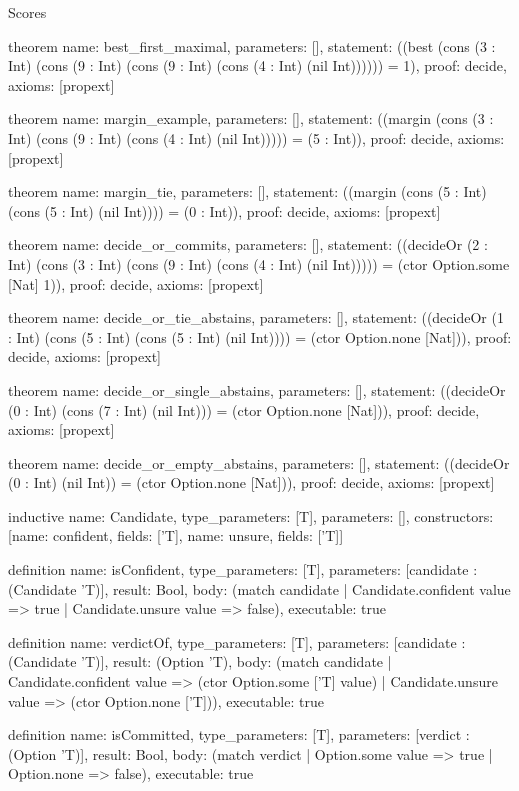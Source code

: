 \begin{lexlean}{Scores}
\begin{semanticmodule}
theorem{
  name: best_first_maximal,
  parameters: [],
  statement: ((best (cons (3 : Int) (cons (9 : Int) (cons (9 : Int) (cons (4 : Int) (nil Int)))))) = 1),
  proof: decide{},
  axioms: [propext]
}

theorem{
  name: margin_example,
  parameters: [],
  statement: ((margin (cons (3 : Int) (cons (9 : Int) (cons (4 : Int) (nil Int))))) = (5 : Int)),
  proof: decide{},
  axioms: [propext]
}

theorem{
  name: margin_tie,
  parameters: [],
  statement: ((margin (cons (5 : Int) (cons (5 : Int) (nil Int)))) = (0 : Int)),
  proof: decide{},
  axioms: [propext]
}

theorem{
  name: decide_or_commits,
  parameters: [],
  statement: ((decideOr (2 : Int) (cons (3 : Int) (cons (9 : Int) (cons (4 : Int) (nil Int))))) = (ctor Option.some [Nat] 1)),
  proof: decide{},
  axioms: [propext]
}

theorem{
  name: decide_or_tie_abstains,
  parameters: [],
  statement: ((decideOr (1 : Int) (cons (5 : Int) (cons (5 : Int) (nil Int)))) = (ctor Option.none [Nat])),
  proof: decide{},
  axioms: [propext]
}

theorem{
  name: decide_or_single_abstains,
  parameters: [],
  statement: ((decideOr (0 : Int) (cons (7 : Int) (nil Int))) = (ctor Option.none [Nat])),
  proof: decide{},
  axioms: [propext]
}

theorem{
  name: decide_or_empty_abstains,
  parameters: [],
  statement: ((decideOr (0 : Int) (nil Int)) = (ctor Option.none [Nat])),
  proof: decide{},
  axioms: [propext]
}

inductive{
  name: Candidate,
  type_parameters: [T],
  parameters: [],
  constructors: [{name: confident, fields: ['T]}, {name: unsure, fields: ['T]}]
}

definition{
  name: isConfident,
  type_parameters: [T],
  parameters: [candidate : (Candidate 'T)],
  result: Bool,
  body: (match candidate | Candidate.confident value => true | Candidate.unsure value => false),
  executable: true
}

definition{
  name: verdictOf,
  type_parameters: [T],
  parameters: [candidate : (Candidate 'T)],
  result: (Option 'T),
  body: (match candidate
    | Candidate.confident value => (ctor Option.some ['T] value)
    | Candidate.unsure value => (ctor Option.none ['T])),
  executable: true
}

definition{
  name: isCommitted,
  type_parameters: [T],
  parameters: [verdict : (Option 'T)],
  result: Bool,
  body: (match verdict | Option.some value => true | Option.none => false),
  executable: true
}


\end{semanticmodule}
\end{lexlean}
